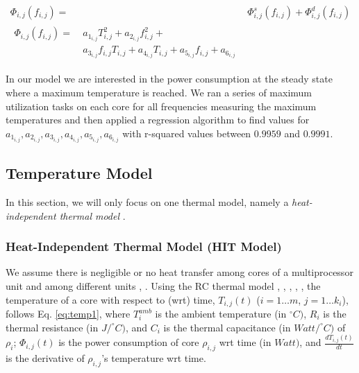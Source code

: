 \documentclass[conference]{IEEEtran}
\begin{document}
\begin{subequations}\label{eq:power}
	\begin{align}
		\Phi_{i,j}(f_{i,j}) =\ &\Phi^{s}_{i,j}(f_{i,j}) + \Phi^{d}_{i,j}(f_{i,j}) \label{eq:gpower} \\
		\begin{split}
			\Phi_{i,j}(f_{i,j}) =\ &a_{1_{i,j}}T^{2}_{i,j} + a_{2_{i,j}}f^{2}_{i,j} + \\
			&a_{3_{i,j}}f_{i,j}T_{i,j} + a_{4_{i,j}}T_{i,j} + a_{5_{i,j}}f_{i,j} + a_{6_{i,j}} \label{eq:tpower}
		\end{split}
	\end{align}
\end{subequations}

In our model we are interested in the power consumption at the steady state where a maximum temperature is reached. We ran a series of maximum utilization tasks on each core for all frequencies measuring the maximum temperatures and then applied a regression algorithm to find values for $a_{1_{i,j}}, a_{2_{i,j}}, a_{3_{i,j}}, a_{4_{i,j}}, a_{5_{i,j}}, a_{6_{i,j}}$ with r-squared values between $0.9959$ and $0.9991$.

\subsection{Temperature Model}

In this section, we will only focus on one thermal model, %
namely a \emph{heat-independent thermal model} \cite{Quan10}.

\subsubsection{Heat-Independent Thermal Model (HIT Model)}

We assume there is negligible or no heat transfer among cores of a multiprocessor unit and among different units \cite{Quan10}, \cite{Chaturvedi10}.
Using the RC thermal model
\cite{Chen09}, \cite{Chantem10}, \cite{Quan10},  \cite{Fisher09}, \cite{Chaturvedi10}, %
the temperature of a core %
with respect to (wrt) time, %
$T_{i,j}(t)$ ($i=1\ldots m$, $j=1\ldots k_i$), %
follows
Eq. \ref{eq:temp1}, where $T_i^{amb}$ is the ambient temperature (in $^\circ C)$,
$R_i$ is the thermal resistance (in $J/ ^\circ C)$, and $C_i$ is the thermal capacitance (in $Watt/ ^\circ C)$ of $\rho_i$; $\Phi_{i,j}(t)$ is the power consumption of core $\rho_{i,j}$  wrt time (in $Watt)$,
and $\frac{dT_{i,j}(t)}{dt}$ is the derivative of $\rho_{i,j}$'s temperature wrt time.
\end{document}
